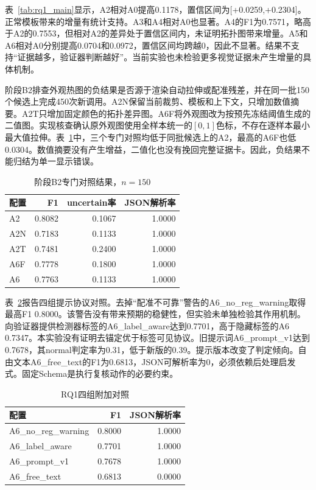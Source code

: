 表~\ref{tab:rq1_main}显示，A2相对A0提高0.1178，置信区间为[+0.0259,+0.2304]。正常模板带来的增量有统计支持。A3和A4相对A0也显著。A4的F1为0.7571，略高于A2的0.7553，但相对A2的差异处于置信区间内，未证明拓扑图带来增量。A5和A6相对A0分别提高0.0704和0.0972，置信区间均跨越0，因此不显著。结果不支持“证据越多，验证器判断越好”。当前实验也未检验更多视觉证据未产生增量的具体机制。

阶段B2排查外观热图的负结果是否源于渲染自动拉伸或配准残差，并在同一批150个候选上完成450次新调用。A2N保留当前裁剪、模板和上下文，只增加数值摘要。A2T只增加固定颜色的拓扑差异图。A6F将外观图改为按预先冻结阈值生成的二值图。实现核查确认原外观图使用全样本统一的$[0,1]$色标，不存在逐样本最小最大值拉伸。表~\ref{tab:rq1_b2}中，三个专门对照均低于同批候选上的A2，最高的A6F也低0.0304。数值摘要没有产生增益，二值化也没有挽回完整证据卡。因此，负结果不能归结为单一显示错误。

\begin{table}[t]
  \centering
  \caption{阶段B2专门对照结果，$n=150$}
  \label{tab:rq1_b2}
  \setlength{\tabcolsep}{5pt}
  \begin{tabular}{lrrr}
    \hline
    配置 & F1 & uncertain率 & JSON解析率 \\
    \hline
    A2  & 0.8082 & 0.1067 & 1.0000 \\
    A2N & 0.7183 & 0.1133 & 1.0000 \\
    A2T & 0.7481 & 0.2400 & 1.0000 \\
    A6F & 0.7778 & 0.1800 & 1.0000 \\
    A6  & 0.7763 & 0.1133 & 1.0000 \\
    \hline
  \end{tabular}
\end{table}

表~\ref{tab:rq1_controls}报告四组提示协议对照。去掉“配准不可靠”警告的A6\_no\_reg\_warning取得最高F1 0.8000。该警告没有带来预期的稳健性，但实验未单独检验其作用机制。向验证器提供检测器标签的A6\_label\_aware达到0.7701，高于隐藏标签的A6 0.7347。本实验没有证明去锚定优于标签可见协议。旧提示词A6\_prompt\_v1达到0.7678，其normal判定率为0.31，低于新版的0.39。提示版本改变了判定倾向。自由文本A6\_free\_text的F1为0.6813，JSON可解析率为0，必须依赖后处理启发式。固定Schema是执行复核动作的必要约束。

\begin{table}[t]
  \centering
  \caption{RQ1四组附加对照}
  \label{tab:rq1_controls}
  \setlength{\tabcolsep}{4pt}
  \begin{tabular}{lrr}
    \hline
    配置 & F1 & JSON解析率 \\
    \hline
    A6\_no\_reg\_warning & 0.8000 & 1.0000 \\
    A6\_label\_aware & 0.7701 & 1.0000 \\
    A6\_prompt\_v1 & 0.7678 & 1.0000 \\
    A6\_free\_text & 0.6813 & 0.0000 \\
    \hline
  \end{tabular}
\end{table}

